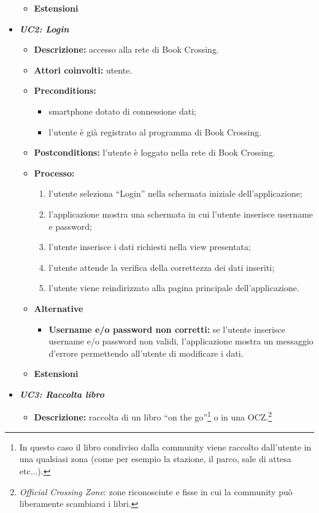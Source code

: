 \begin{itemize}
\begin{itemize}
\begin{itemize}
		\end{itemize}
		\item \textbf{Estensioni}
	\end{itemize}
	\item \textbf{\textit{UC2: Login}}
	\begin{itemize}
		\item \textbf{Descrizione:} accesso alla rete di Book Crossing.
		\item \textbf{Attori coinvolti:} utente. 
		\item \textbf{Preconditions:} 
		\begin{itemize}
			\item smartphone dotato di connessione dati;
			\item l’utente è già registrato al programma di Book Crossing.
		\end{itemize}
		\item \textbf{Postconditions:} l’utente è loggato nella rete di Book Crossing.
		\item \textbf{Processo:}
		\begin{enumerate}
			\item l’utente seleziona “Login” nella schermata iniziale dell’applicazione;
			\item l’applicazione mostra una schermata in cui l'utente inserisce username e password;
			\item l’utente inserisce i dati richiesti nella view presentata;
			\item l'utente attende la verifica della correttezza dei dati inseriti;
			\item l’utente viene reindirizzato alla pagina principale dell’applicazione.
		\end{enumerate}
		\item \textbf{Alternative}
		\begin{itemize}
			\item \textbf{Username e/o password non corretti:}  se l'utente inserisce username e/o password non validi, l'applicazione mostra un messaggio d'errore permettendo all'utente di modificare i dati.
		\end{itemize}
		\item \textbf{Estensioni}
	\end{itemize}
	\item \textit{\textbf{UC3: Raccolta libro}}
	\begin{itemize}
		\item \textbf{Descrizione:} raccolta di un libro “on the go”\footnote{In questo caso il libro condiviso dalla community viene raccolto dall'utente in una qualsiasi zona (come per esempio la stazione, il parco, sale di attesa etc...).} o in una OCZ.\footnote{\textit{Official Crossing Zone}: zone riconosciute e fisse in cui la community può liberamente scambiarsi i libri.}

\end{itemize}
\end{itemize}
